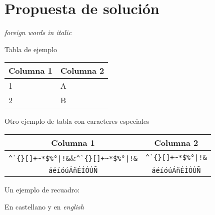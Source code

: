 \chapter{Propuesta de solución}
\label{Propuesta de solución}
\textit{foreign words in italic}

Tabla de ejemplo

\vspace{0.5cm}

\begin{center}
\begin{tabular}{|l|l|}
\hline
\textbf{Columna 1}&\textbf{Columna 2}\\
\hline
1&A\\
\hline
2&B\\
\hline
\end{tabular}
\end{center}

\vspace{0.5cm}

Otro ejemplo de tabla con caracteres especiales

\vspace{0.5cm}

\begin{center}
\begin{tabular}{|c|c|}
    \hline
    \textbf{Columna 1}&\textbf{Columna 2}\\
    \hline
    \verb.^`{}[]+~*$%°|!&.&\verb.^`{}[]+~*$%°|!&.\\
    \hline
    \verb.áéíóúÁñÉÍÓÚÑ.&\verb.áéíóúÁñÉÍÓÚÑ.\\
    \hline
\end{tabular}
\end{center}

\vspace{0.5cm}

Un ejemplo de recuadro:

\vspace{0.5cm}
\begin{boxB}
En castellano y en \textit{english}
\end{boxB}